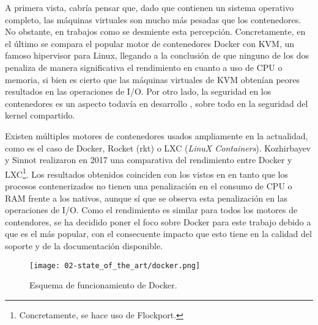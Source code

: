 A primera vista, cabría pensar que, dado que contienen un sistema operativo
completo, las máquinas virtuales son mucho más pesadas que los contenedores. No
obstante, en trabajos como \cite{manco_my_2017} \cite{felter_updated_2015} se
desmiente esta percepción. Concretamente, en el último se compara el popular
motor de contenedores Docker con KVM, un famoso hipervisor para Linux, llegando
a la conclusión de que ninguno de los dos penaliza de manera significativa el
rendimiento en cuanto a uso de CPU o memoria, si bien es cierto que las máquinas
virtuales de KVM obtenían peores resultados en las operaciones de I/O. Por otro
lado, la seguridad en los contenedores es un aspecto todavía en desarrollo
\cite{randal_ideal_2020}, sobre todo en la seguridad del kernel compartido.

Existen múltiples motores de contenedores usados ampliamente en la actualidad,
como es el caso de Docker, Rocket (rkt) o LXC (\textit{LinuX Containers}).
Kozhirbayev y Sinnot \cite{kozhirbayev_performance_2017} realizaron en 2017 una
comparativa del rendimiento entre Docker y LXC\footnote{Concretamente, se hace
  uso de Flockport.}. Los resultados obtenidos coinciden con los vistos en
\cite{felter_updated_2015} en tanto que los procesos contenerizados no tienen
una penalización en el consumo de CPU o RAM frente a los nativos, aunque sí que
se observa esta penalización en las operaciones de I/O. Como el rendimiento es
similar para todos los motores de contendores, se ha decidido poner el foco
sobre Docker para este trabajo debido a que es el más popular, con el
consecuente impacto que esto tiene en la calidad del soporte y de la
documentación disponible.

\begin{figure}
  \centering
  \texttt{[image: 02-state\_of\_the\_art/docker.png]}
  \caption{Esquema de funcionamiento de Docker.}
  \label{fig:02-docker}
\end{figure}

